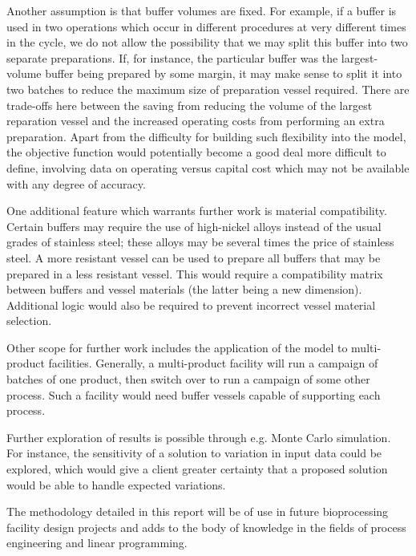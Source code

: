 Another assumption is that buffer volumes are fixed.
For example, if a buffer is used in two operations which occur in different
procedures at very different times in the cycle, we do not allow the
possibility that we may split this buffer into two separate preparations.
If, for instance, the particular buffer was the largest-volume buffer being
prepared by some margin, it may make sense to split it into two batches to
reduce the maximum size of preparation vessel required.
There are trade-offs here between the saving from reducing the volume of the
largest reparation vessel and the increased operating costs from performing an
extra preparation.
Apart from the difficulty for building such flexibility into the model, the
objective function would potentially become a good deal more difficult to
define, involving data on operating versus capital cost which may not be
available with any degree of accuracy.

One additional feature which warrants further work is material compatibility.
Certain buffers may require the use of high-nickel alloys instead of the
usual grades of stainless steel; these alloys may be several times the price
of stainless steel.
A more resistant vessel can be used to prepare all buffers that may be prepared
in a less resistant vessel.
This would require a compatibility matrix between buffers and vessel materials
(the latter being a new dimension).
Additional logic would also be required to prevent incorrect vessel material
selection.

Other scope for further work includes the application of the model to
multi-product facilities.
Generally, a multi-product facility will run a campaign of batches of one
product, then switch over to run a campaign of some other process.
Such a facility would need buffer vessels capable of supporting each process.

Further exploration of results is possible through e.g. Monte Carlo simulation.
For instance, the sensitivity of a solution to variation in input data could
be explored, which would give a client greater certainty that a proposed
solution would be able to handle expected variations.

The methodology detailed in this report will be of use in future bioprocessing
facility design projects and adds to the body of knowledge in the fields of
process engineering and linear programming.
